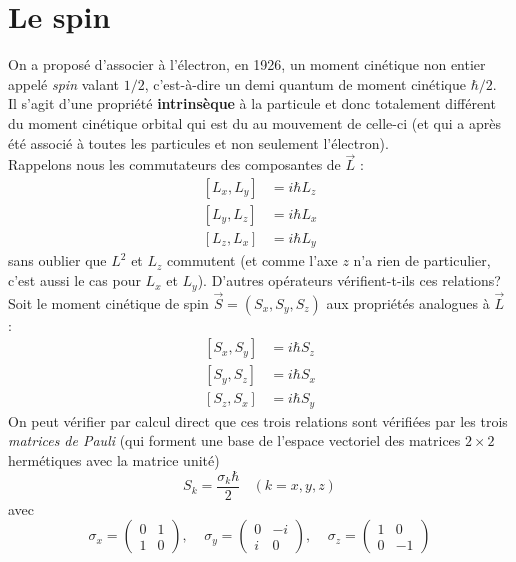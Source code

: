 \documentclass[british,french,11pt, a4paper, openany]{book}
\begin{document}
\section{Le spin}
On a proposé d'associer à l'électron, en 1926, un moment cinétique non entier appelé
\textit{spin} valant $1/2$, c'est-à-dire un demi quantum de moment cinétique $\hbar/
2$.\\
Il s'agit d'une propriété \textbf{intrinsèque} à la particule et donc totalement 
différent du moment cinétique orbital qui est du au mouvement de celle-ci (et qui 
a après été associé à toutes les particules et non seulement l'électron).\\
Rappelons nous les commutateurs des composantes de $\vec{L}$ :
\begin{equation}
	\begin{array}{ll}
		[L_x,L_y]            & = i\hbar L_z \\
		\left[L_y,L_z\right] & = i\hbar L_x \\
		\left[L_z,L_x\right] & = i\hbar L_y 
	\end{array}
\end{equation}
sans oublier que $L^2$ et $L_z$ commutent (et comme l'axe $z$ n'a rien de particulier,
c'est aussi le cas pour $L_x$ et $L_y$). D'autres opérateurs vérifient-t-ils ces 
relations? \\
Soit le moment cinétique de spin $\vec{S} = (S_x,S_y,S_z)$ aux propriétés analogues
à $\vec{L}$ :
\begin{equation}
	\begin{array}{cc}
		[S_x,S_y]            & = i\hbar S_z \\
		\left[S_y,S_z\right] & = i\hbar S_x \\
		\left[S_z,S_x\right] & = i\hbar S_y 
	\end{array}
\end{equation}
On peut vérifier par calcul direct que ces trois relations sont vérifiées par les 
trois \textit{matrices de Pauli} (qui forment une base de l'espace vectoriel des 
matrices $2\times2$ hermétiques avec la matrice unité)
\begin{equation}
	S_k = \frac{\sigma_k \hbar}{2}\ \ \ \ (k=x,y,z)
\end{equation}
avec
\begin{equation}
	\sigma_x = \left(\begin{array}{cc}
		0 & 1\\
		1 & 0
	\end{array}\right),\ \ \ \ \ \sigma_y =	\left(\begin{array}{cc}
	0 & -i\\
	i & 0
\end{array}\right),\ \ \ \ \ \sigma_z =	\left(\begin{array}{cc}
1 & 0\\
0 & -1
\end{array}\right)
\end{equation}
\end{document}

